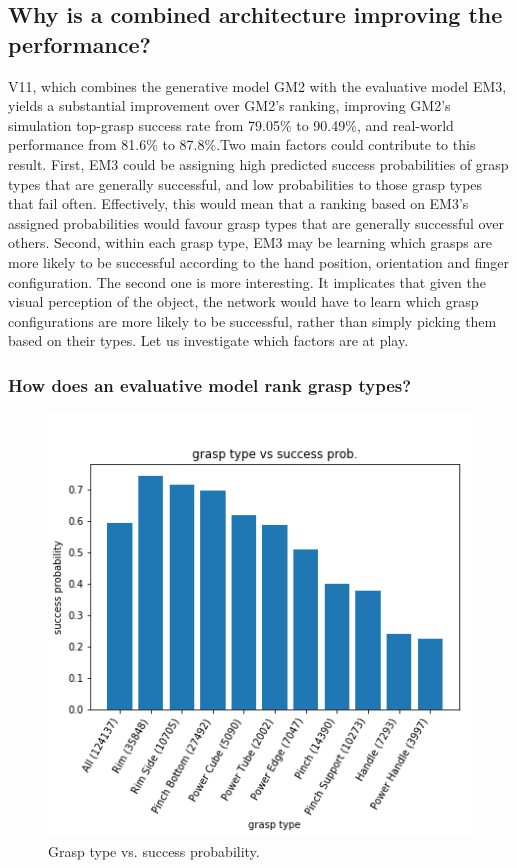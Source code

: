 \subsection{Why is a combined architecture improving the performance?}
\noindent

V11, which combines the generative model GM2 with the evaluative model EM3, yields a substantial improvement over GM2's ranking, improving GM2's simulation top-grasp success rate from 79.05\% to 90.49\%, and real-world performance from 81.6\% to 87.8\%.Two main factors could contribute to this result. First, EM3 could be assigning high predicted success probabilities of grasp types that are generally successful, and low probabilities to those grasp types that fail often. Effectively, this would mean that a ranking based on EM3's assigned probabilities would favour grasp types that are generally successful over others. Second, within each grasp type, EM3 may be learning which grasps are more likely to be successful according to the hand position, orientation and finger configuration. The second one is more interesting. It implicates that given the visual perception of the object, the network would have to learn which grasp configurations are more likely to be successful, rather than simply picking them based on their types. Let us investigate which factors are at play.

\subsubsection{How does an evaluative model rank grasp types?}
\noindent


\begin{figure}
\centering 
\includegraphics[width=0.6\columnwidth]{images/post-analysis/Grasp_type_vs_success_prob.png}
\caption{Grasp type vs. success probability.}
\label{fig:post2}
\end{figure}

